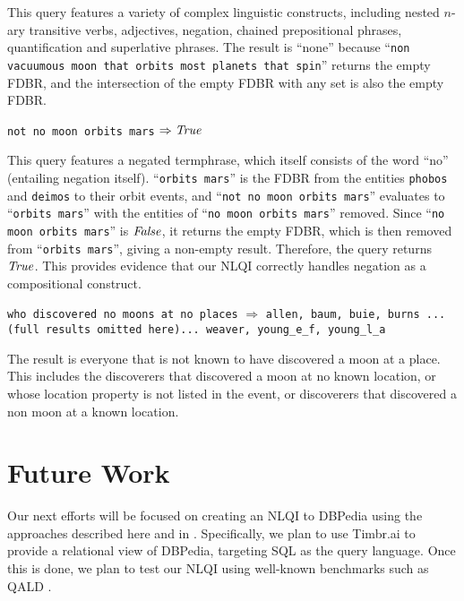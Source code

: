 \documentclass[../main.tex]{subfiles}
\begin{document}
\begin{refsection}
\examplespacing

\noindent This query features a variety of complex linguistic constructs, including nested $n$-ary transitive verbs, adjectives, negation, chained prepositional phrases, quantification and superlative phrases.  The result is ``none'' because ``\texttt{non vacuumous moon that orbits most planets that spin}'' returns the empty FDBR, and the intersection of the empty FDBR with any set is also the empty FDBR.

\examplespacing

\texttt{not no moon orbits mars} $\Rightarrow \mathit{True}$

\examplespacing

\noindent This query features a negated termphrase, which itself consists of the word ``no'' (entailing negation itself). ``\texttt{orbits mars}'' is the FDBR from the entities \texttt{phobos} and \texttt{deimos} to their orbit events, and ``\texttt{not no moon orbits mars}'' evaluates to ``\texttt{orbits mars}'' with the entities of ``\texttt{no moon orbits mars}'' removed.  Since ``\texttt{no moon orbits mars}'' is $\mathit{False}$, it returns the empty FDBR, which is then removed from ``\texttt{orbits mars}'', giving a non-empty result.  Therefore, the query returns $\mathit{True}$. This provides evidence that our NLQI correctly handles negation as a compositional construct.

\examplespacing

\texttt{who discovered no moons at no places} $\Rightarrow$ \texttt{allen, baum, buie, burns ...(full results omitted here)... weaver, young\_e\_f, young\_l\_a}

\examplespacing

\noindent The result is everyone that is not known to have discovered a moon at a place.  This includes the discoverers that discovered a moon at no known location, or whose location property is not listed in the event, or discoverers that discovered a non moon at a known location.

\examplespacing

\section{Future Work}
\label{sec:future}

\noindent Our next efforts will be focused on creating an NLQI to DBPedia using the approaches
described here and in \cite{peelar2020webistjournal}.  Specifically, we plan to use Timbr.ai \cite{timbr} to provide a relational view of DBPedia, targeting SQL as the query language.
Once this is done, we plan to test our NLQI using well-known benchmarks such as QALD \cite{qald9}.


\end{refsection}
\end{document}
